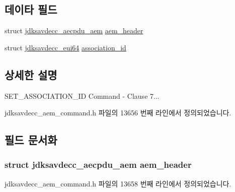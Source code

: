 \subsection*{데이타 필드}
\begin{DoxyCompactItemize}
\item 
struct \hyperlink{structjdksavdecc__aecpdu__aem}{jdksavdecc\+\_\+aecpdu\+\_\+aem} \hyperlink{structjdksavdecc__aem__command__set__association__id_ae1e77ccb75ff5021ad923221eab38294}{aem\+\_\+header}
\item 
struct \hyperlink{structjdksavdecc__eui64}{jdksavdecc\+\_\+eui64} \hyperlink{structjdksavdecc__aem__command__set__association__id_a0fa49c5118429af7a5ee7d71eada7b94}{association\+\_\+id}
\end{DoxyCompactItemize}


\subsection{상세한 설명}
S\+E\+T\+\_\+\+A\+S\+S\+O\+C\+I\+A\+T\+I\+O\+N\+\_\+\+ID Command -\/ Clause 7... 

jdksavdecc\+\_\+aem\+\_\+command.\+h 파일의 13656 번째 라인에서 정의되었습니다.



\subsection{필드 문서화}
\subsubsection[{\texorpdfstring{aem\+\_\+header}{aem_header}}]{\setlength{\rightskip}{0pt plus 5cm}struct {\bf jdksavdecc\+\_\+aecpdu\+\_\+aem} aem\+\_\+header}\hypertarget{structjdksavdecc__aem__command__set__association__id_ae1e77ccb75ff5021ad923221eab38294}{}\label{structjdksavdecc__aem__command__set__association__id_ae1e77ccb75ff5021ad923221eab38294}


jdksavdecc\+\_\+aem\+\_\+command.\+h 파일의 13658 번째 라인에서 정의되었습니다.


